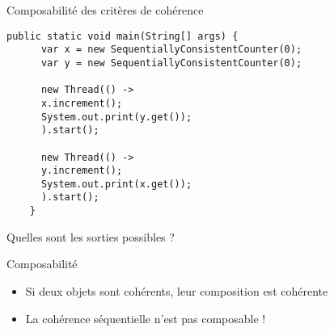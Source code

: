 
\begingroup

\begin{frame}[fragile]{Composabilité des critères de cohérence}
  \begin{lstlisting}[numbers=none]
    public static void main(String[] args) {    
      var x = new SequentiallyConsistentCounter(0);
      var y = new SequentiallyConsistentCounter(0);
      
      new Thread(() ->
      x.increment();
      System.out.print(y.get());
      ).start();
      
      new Thread(() ->
      y.increment();
      System.out.print(x.get());
      ).start();
    }
  \end{lstlisting}

  \vspace{-3mm}
  \begin{center}
    \color{exampleColor} Quelles sont les sorties possibles ? 
  \end{center}
  \pause
  \begin{block}{Composabilité}
    \begin{itemize}
    \item Si deux objets sont cohérents, leur composition est cohérente 
    \item \alert{La cohérence séquentielle n'est pas composable !}
    \end{itemize}
  \end{block}
\end{frame}

\endgroup
\endinput
